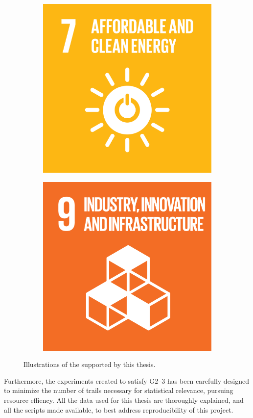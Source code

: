 \begin{figure}
    \centering
    \begin{subfigure}[b]{0.5\linewidth}
        \centering
        \includegraphics[width=0.6\linewidth]{figures/1-introduction/SDG_icons-07.png} 
        \label{fig:sdg07}
    \end{subfigure}\hfill
    \begin{subfigure}[b]{0.5\linewidth}
        \centering
        \includegraphics[width=0.6\linewidth]{figures/1-introduction/SDG_icons-09.png}
        \label{fig:sdg09}
	\end{subfigure}
	\caption[Sustainable Development Goals supported by this thesis]{Illustrations of the  supported by this thesis.}
	\label{fig:sdgs}
\end{figure}

Furthermore, the experiments created to satisfy \gls{G}2--3 has been carefully designed to minimize the number of trails necessary for statistical relevance, pursuing resource effiency. All the data used for this thesis are thoroughly explained, and all the scripts made available, to best address reproducibility of this project.